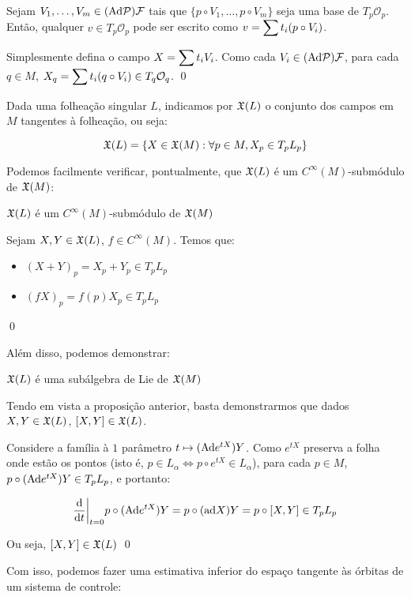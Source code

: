 \dem Sejam $V_1, \dots, V_m \in (\text{Ad} \mathcal{P})\mathcal{F}$ tais que
$\{p \circ V_1, \dots, p \circ V_m\}$ seja uma base de $T_p\mathcal{O}_p$.
Então, qualquer $v \in T_p\mathcal{O}_p$ pode ser escrito como
$v = \displaystyle\sum t_i (p \circ V_i)$.

Simplesmente defina o campo $X = \displaystyle\sum t_i V_i$. Como cada
$V_i \in (\text{Ad} \mathcal{P})\mathcal{F}$, para cada $q \in M$,
$X_q = \displaystyle\sum t_i (q \circ V_i)\in T_q\mathcal{O}_q$. \qed

Dada uma folheação singular $L$, indicamos por $\mathfrak{X}(L)$ o conjunto dos campos
em $M$ tangentes à folheação, ou seja:

$$\mathfrak{X}(L) = \{X \in \mathfrak{X}(M) : \forall p \in M, X_p \in T_pL_p\}$$

Podemos facilmente verificar, pontualmente, que $\mathfrak{X}(L)$ é um $C^\infty(M)$-submódulo
de $\mathfrak{X}(M)$:

\begin{proposition}
    $\mathfrak{X}(L)$ é um $C^\infty(M)$-submódulo
    de $\mathfrak{X}(M)$
\end{proposition}

\dem Sejam $X, Y \in \mathfrak{X}(L)$, $f \in C^\infty(M)$. Temos que:

\begin{itemize}
    \item $(X+Y)_p = X_p + Y_p \in T_pL_p$
    \item $(fX)_p = f(p)X_p \in T_pL_p$
\end{itemize} \qed

Além disso, podemos demonstrar:

\begin{proposition}
    $\mathfrak{X}(L)$ é uma subálgebra de Lie de $\mathfrak{X}(M)$
\end{proposition}

\dem Tendo em vista a proposição anterior, basta demonstrarmos
que dados $X, Y \in \mathfrak{X}(L)$, $[X,Y] \in \mathfrak{X}(L)$.

Considere a família à $1$ parâmetro $t \mapsto (\text{Ad} e^{tX}) Y$. Como
$e^{tX}$ preserva a folha onde estão os pontos (isto é,
$p \in L_\alpha \iff p\circ e^{tX} \in L_\alpha$),
para cada $p \in M$, $p \circ (\text{Ad} e^{tX}) Y \in T_pL_p$,
e portanto:

$$\frac{\text{d} }{\text{d} t}\bigg|_{t=0} p \circ (\text{Ad} e^{tX}) Y = p \circ (\text{ad} X) Y = p \circ [X,Y] \in T_pL_p$$

Ou seja, $[X,Y] \in \mathfrak{X}(L)$ \qed

Com isso, podemos fazer uma estimativa inferior do espaço tangente às órbitas
de um sistema de controle:

